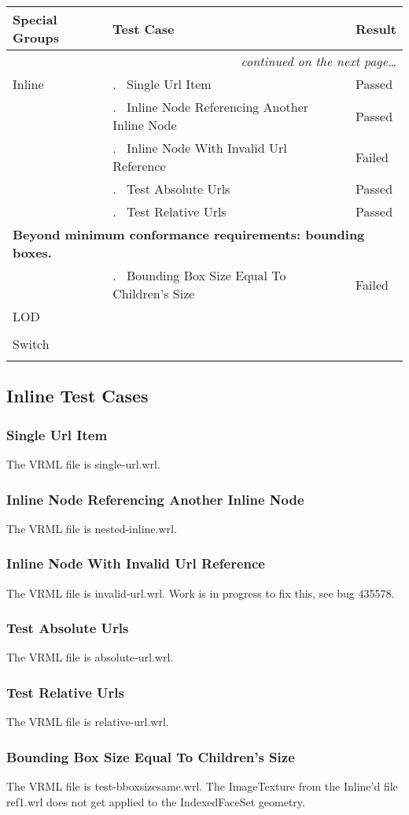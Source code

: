 \documentclass[12pt,letterpaper]{article}
\newcounter{testCaseCtr}
\newcommand{\testCase}{\arabic{testCaseCtr}.~ \stepcounter{testCaseCtr}}
\newcommand{\resetTestCase}{\setcounter{testCaseCtr}{1}}
\newcommand{\SpGrA}{Single Url Item}
\newcommand{\SpGrB}{Inline Node Referencing Another Inline Node}
\newcommand{\SpGrC}{Inline Node With Invalid Url Reference}
\newcommand{\SpGrD}{Test Absolute Urls}
\newcommand{\SpGrE}{Test Relative Urls}
\newcommand{\SpGrF}{Bounding Box Size Equal To Children's Size}
\begin{document}
\begin{center}
\setlongtables
\begin{longtable}{|l|l|l|}
\hline
\textbf{Special Groups} & \textbf{Test Case} & \textbf{Result} \\
\hline\hline
\endhead
\cline{2-3}
 & \multicolumn{2}{|r|}{\textsl{continued on the next page\ldots}} \\
\hline
\endfoot
\hline
\endlastfoot
Inline & \testCase \SpGrA & Passed \\\cline{2-3}
& \testCase \SpGrB & Passed \\\cline{2-3}
& \testCase \SpGrC &  Failed \\\cline{2-3}
& \testCase \SpGrD & Passed \\\cline{2-3}
& \testCase \SpGrE & Passed \\\hline
\multicolumn{3}{|l|}{\textbf{Beyond minimum conformance requirements:
bounding boxes.}} \\\hline
& \testCase \SpGrF & Failed \\\hline
\resetTestCase
LOD & & \\\cline{2-3}
& & \\\hline
\resetTestCase
Switch & & \\\cline{2-3}
& & \\
\end{longtable}
\end{center}

\subsection{Inline Test Cases}

\subsubsection{\SpGrA}
The VRML file is single-url.wrl.

\subsubsection{\SpGrB}
The VRML file is nested-inline.wrl.

\subsubsection{\SpGrC}
The VRML file is invalid-url.wrl.\newline
Work is in progress to fix this, see bug 435578.

\subsubsection{\SpGrD}
The VRML file is absolute-url.wrl.

\subsubsection{\SpGrE}
The VRML file is relative-url.wrl.

\subsubsection{\SpGrF}
The VRML file is test-bboxsizesame.wrl.\newline
The ImageTexture from the Inline'd file ref1.wrl does not get
applied to the IndexedFaceSet geometry.
\end{document}
